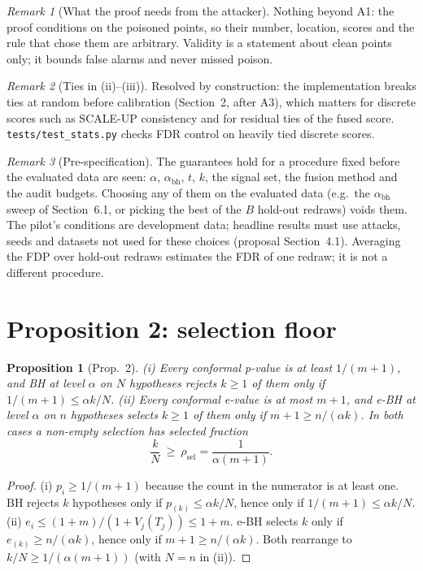 \documentclass[11pt]{article}
\newtheorem{proposition}{Proposition}
\theoremstyle{definition}
\theoremstyle{remark}
\newtheorem{remark}{Remark}
\newcommand{\1}{\mathbf{1}}
\begin{document}
\begin{remark}[What the proof needs from the attacker]
Nothing beyond A1: the proof conditions on the poisoned points, so their number, location, scores
and the rule that chose them are arbitrary. Validity is a statement about clean points only; it
bounds false alarms and never missed poison.
\end{remark}

\begin{remark}[Ties in (ii)--(iii)]
Resolved by construction: the implementation breaks ties at random before calibration
(Section~2, after A3), which matters for discrete scores such as SCALE-UP consistency and for
residual ties of the fused score. \texttt{tests/test\_stats.py} checks FDR control on heavily tied
discrete scores.
\end{remark}

\begin{remark}[Pre-specification]\label{rem:prespec}
The guarantees hold for a procedure fixed before the evaluated data are seen: $\alpha$,
$\alpha_{\mathrm{bh}}$, $t$, $k$, the signal set, the fusion method and the audit budgets. Choosing
any of them on the evaluated data (e.g.\ the $\alpha_{\mathrm{bh}}$ sweep of Section~6.1, or picking the
best of the $B$ hold-out redraws) voids them. The pilot's conditions are development data; headline
results must use attacks, seeds and datasets not used for these choices (proposal Section~4.1).
Averaging the FDP over hold-out redraws estimates the FDR of one redraw; it is not a different
procedure.
\end{remark}

\section{Proposition 2: selection floor}

\begin{proposition}[Prop.~2]\label{prop:floor}
(i) Every conformal p-value is at least $1/(m+1)$, and BH at level $\alpha$ on $N$ hypotheses
rejects $k\ge1$ of them only if $1/(m+1)\le\alpha k/N$. (ii) Every conformal e-value is at most
$m+1$, and e-BH at level $\alpha$ on $n$ hypotheses selects $k\ge1$ of them only if
$m+1\ge n/(\alpha k)$. In both cases a non-empty selection has selected fraction
\[
\frac{k}{N}\ \ge\ \rho_{\mathrm{sel}}=\frac{1}{\alpha(m+1)} .
\]
\end{proposition}

\begin{proof}
(i) $p_i\ge1/(m+1)$ because the count in the numerator is at least one. BH rejects $k$ hypotheses
only if $p_{(k)}\le\alpha k/N$, hence only if $1/(m+1)\le\alpha k/N$. (ii) $e_i\le(1+m)/(1+V_j(T_j))
\le1+m$. e-BH selects $k$ only if $e_{(k)}\ge n/(\alpha k)$, hence only if $m+1\ge n/(\alpha k)$.
Both rearrange to $k/N\ge1/(\alpha(m+1))$ (with $N=n$ in (ii)).
\end{proof}
\end{document}
